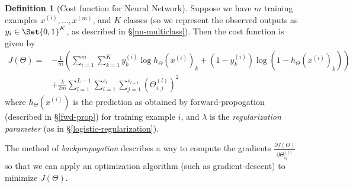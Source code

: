 \documentclass[a4paper,12pt]{article}
\theoremstyle{definition}
\newtheorem*{defn}{Definition}
\begin{document}
\begin{defn}[Cost function for Neural Network]
Suppose we have $m$ training examples $x^{(i)}, \ldots, x^{(m)}$, and $K$ classes (so we represent the observed outputs as $y_i \in \Set{0, 1}^K$, as described in \S\ref{nn-multiclass}). Then the cost function is given by
\begin{align*}
J(\Theta) = &- \frac{1}{m} \left( \sum_{i=1}^{m} \sum_{k=1}^{K} y_k^{(i)} \log{h_{\Theta}(x^{(i)})_k} + (1 - y_k^{(i)}) \log{(1 - h_{\Theta}(x^{(i)})_k)} \right) \\
&+ \frac{\lambda}{2m} \sum_{l = 1}^{L-1} \sum_{i=1}^{s_l} \sum_{j=1}^{s_{l+1}} ( \Theta_{i, j}^{(l)} )^2
\end{align*}
where $h_{\Theta}(x^{(i)})$ is the prediction as obtained by forward-propogation (described in \S\ref{fwd-prop}) for training example $i$, and $\lambda$ is the \emph{regularization parameter} (as in \S\ref{logistic-regularization}).
\end{defn}

The method of \emph{backpropogation} describes a way to compute the gradients $\frac{\partial J(\Theta)}{\partial \Theta_{ij}^{(l)}}$ so that we can apply an optimization algorithm (such as gradient-descent) to minimize $J(\Theta)$.
\end{document}
